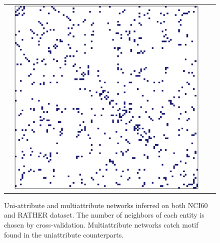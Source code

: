 \begin{frame}
\begin{figure}[htbp!]
\begin{tabular}{@{}lccc@{}}
    & \includegraphics[width=.25\textwidth]{figures/bivarNet_RATHER} \\
  \end{tabular}
  \caption{Uni-attribute and multiattribute networks inferred on both
    NCI60 and RATHER dataset. The number of neighbors of each entity
    is chosen by cross-validation. Multiattribute networks catch motif
    found in the uniattribute counterparts.}
  \label{fig:networks}
\end{figure}

\end{frame}

